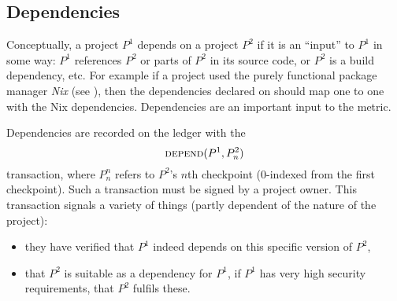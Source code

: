 \subsection{Dependencies}
\label{s:dependencies}

Conceptually, a project $P^1$ depends on a project $P^2$ if it is an
``input'' to $P^1$ in some way: $P^1$ references $P^2$ or parts of
$P^2$ in its source code, or $P^2$ is a build dependency, etc. For
example if a project used the purely functional package manager
\emph{Nix} (see \cite{nix}), then the dependencies declared on
\oscoin{} should map one to one with the Nix
dependencies. Dependencies are an important input to the \osrank{}
metric.

Dependencies are recorded on the ledger with the
\[
    \text{\normalfont\scshape depend}\small{\lparen P^1, P^2_n\rparen}
\]
transaction, where $P^n_n$ refers to $P^2$'s $n$th checkpoint
($0$-indexed from the first checkpoint). Such a transaction must be
signed by a project owner. This transaction signals a variety of
things (partly dependent of the nature of the project):
\begin{itemize}
\item they have verified that $P^1$ indeed depends on this specific
  version of $P^2$,
\item that $P^2$ is suitable as a dependency for $P^1$, \eg{} if $P^1$
  has very high security requirements, that $P^2$ fulfils these.
\end{itemize}

